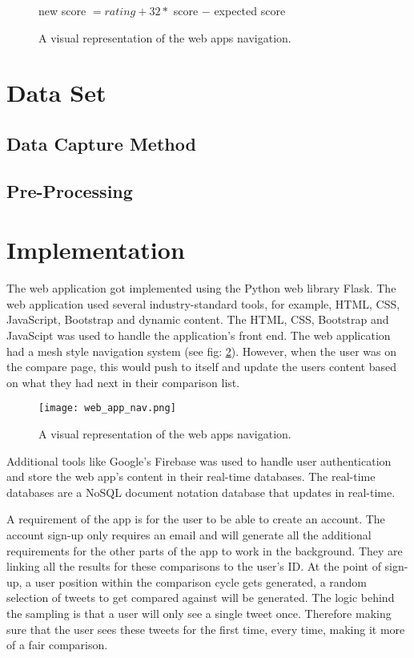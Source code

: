 \begin{figure}[t]
	\centering

	new score $= rating + 32 * $  score $ - $ expected score
	\caption{A visual representation of the web apps navigation.}
	\label{fig:elo_maths_2}
\end{figure}
	
	\section{Data Set}
	
	\subsection{Data Capture Method}
	
	\subsection{Pre-Processing}
	
	
	\section{Implementation}
	
	The web application got implemented using the Python web library Flask. The web application used several industry-standard tools, for example, HTML, CSS, JavaScript, Bootstrap and dynamic content. The HTML, CSS, Bootstrap and JavaScipt was used to handle the application's front end. The web application had a mesh style navigation system (see fig: \ref{fig:web_app_nav}). However, when the user was on the compare page, this would push to itself and update the users content based on what they had next in their comparison list.
	
	\begin{figure}[t]
		\centering
		\texttt{[image: web\_app\_nav.png]}
		\caption{A visual representation of the web apps navigation.}
		\label{fig:web_app_nav}
		
	\end{figure}
	
	Additional tools like Google's Firebase was used to handle user authentication and store the web app's content in their real-time databases. The real-time databases are a NoSQL document notation database that updates in real-time. 
	
	A requirement of the app is for the user to be able to create an account. The account sign-up only requires an email and will generate all the additional requirements for the other parts of the app to work in the background. They are linking all the results for these comparisons to the user's ID. At the point of sign-up, a user position within the comparison cycle gets generated, a random selection of tweets to get compared against will be generated. The logic behind the sampling is that a user will only see a single tweet once. Therefore making sure that the user sees these tweets for the first time, every time, making it more of a fair comparison.
	
